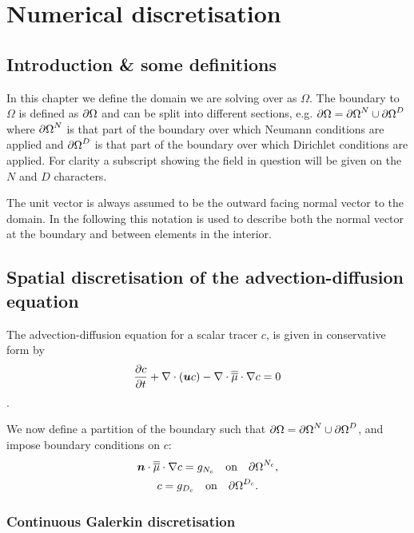 \chapter{Numerical discretisation}\label{chap:numerical_discretisation}
\section{Introduction \& some definitions}\label{Sect:ND_Intro}

In this chapter we define the domain we are solving over as $\Omega$. The boundary to
$\Omega$ is defined as ${\partial\Omega}$
and can be split into different sections, e.g.
$\partial\Omega = {\partial\Omega}^{N}\cup {\partial\Omega}^{D}$
where ${\partial\Omega}^{N}$ is that part of the boundary over
which Neumann conditions are applied and ${\partial\Omega}^{D}$ is that part of the boundary over
which Dirichlet conditions are applied. For clarity a subscript showing the field in question will
be given on the $N$ and $D$ characters.

The unit vector  is always assumed to be the
outward facing normal vector to the domain.
In the following this notation is used to describe both the normal vector at the boundary
and between elements in the interior.

\section{Spatial discretisation of the advection-diffusion equation}
\label{Sect:ND_advection_diffusion_discretisation}

The advection-diffusion equation for a scalar tracer $c$,
is given in conservative form by
\begin{equation}\label{eq:advdif}
  \frac{\partial c}{\partial t} + \nabla\cdot\left({\mbox{\boldmath$u$}} c\right) - \nabla\cdot\overline{\overline{\mu}}\cdot\nabla c = 0
\end{equation}.

We now define a partition of the boundary such that
$\partial\Omega = {\partial\Omega}^{N}\cup {\partial\Omega}^{D}$, and impose boundary conditions on $c$:
\begin{gather}
  \label{eq:cboundary}
  {\mbox{\boldmath$n$}}\cdot\overline{\overline{\mu}}\cdot\nabla c=g_{N_c} \quad\textrm{on}\quad {\partial\Omega}^{N_c},\\
  c=g_{D_c} \quad\textrm{on}\quad {\partial\Omega}^{D_c}.
\end{gather}

\subsection{Continuous Galerkin discretisation}
\label{sect:ND_advection_diffusion_CG}

